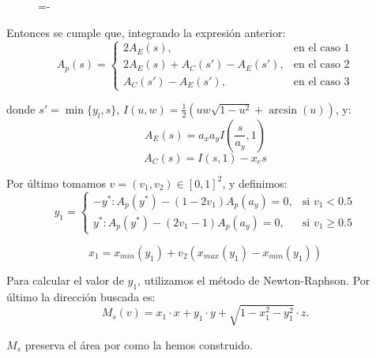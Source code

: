\begin{figure}[h]
  \lineskip=-\fboxrule
\end{figure}

Entonces se cumple que, integrando la expresión anterior:
\[ A_p(s) = 
   \begin{cases} 
       2A_E(s),  & \text{en el caso 1} \\
       2A_E(s) + A_C(s') - A_E(s'),  & \text{en el caso 2} \\
       A_C(s') - A_E(s'),  & \text{en el caso 3} 
   \end{cases}
\]

donde $s'=\min\{y_l,s\}$, $I(u,w) = \frac{1}{2}(uw\sqrt{1-u^2} + \arcsin(u))$, y:
$$A_E(s) = a_xa_yI(\frac{s}{a_y},1)$$
$$A_C(s) = I(s,1)-x_es$$

Por último tomamos $v=(v_1,v_2)\in[0,1]^2$, y definimos:
\[ y_1 = 
   \begin{cases} 
      -y^*: A_p(y^*)-(1-2v_1)A_p(a_y)=0,  & \text{si $v_1<0.5$} \\
      y^*:  A_p(y^*)-(2v_1-1)A_p(a_y)=0,  & \text{si $v_1\geq 0.5$}
   \end{cases}
\]

$$x_1 = x_{min}(y_1) + v_2 (x_{max}(y_1) - x_{min}(y_1))$$

Para calcular el valor de $y_1$, utilizamos el método de Newton-Raphson. Por último la dirección buscada es:
$$M_s(v) = x_1\cdot x + y_1\cdot y + \sqrt{1-x_1^2-y_1^2} \cdot z.$$

$M_s$ preserva el área por como la hemos construido.

